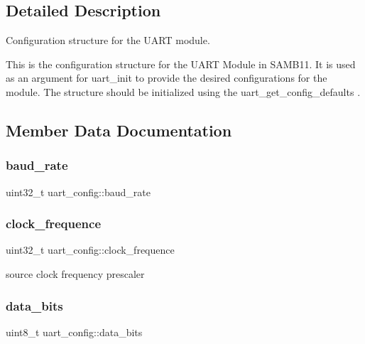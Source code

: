 \subsection{Detailed Description}
Configuration structure for the U\+A\+RT module. 

This is the configuration structure for the U\+A\+RT Module in S\+A\+M\+B11. It is used as an argument for uart\+\_\+init to provide the desired configurations for the module. The structure should be initialized using the uart\+\_\+get\+\_\+config\+\_\+defaults . 

\subsection{Member Data Documentation}
\mbox{\label{structuart__config_a3002fe5cb1c359f93dddb9198356bdcc}} 
\subsubsection{\texorpdfstring{baud\+\_\+rate}{baud\_rate}}
{\footnotesize\ttfamily uint32\+\_\+t uart\+\_\+config\+::baud\+\_\+rate}

\mbox{\label{structuart__config_a07d92658a8aea18961c39878c11fa689}} 
\subsubsection{\texorpdfstring{clock\+\_\+frequence}{clock\_frequence}}
{\footnotesize\ttfamily uint32\+\_\+t uart\+\_\+config\+::clock\+\_\+frequence}

source clock frequency prescaler \mbox{\label{structuart__config_a93ee24cf6669fb4cfece78a53d3ec6c5}} 
\subsubsection{\texorpdfstring{data\+\_\+bits}{data\_bits}}
{\footnotesize\ttfamily uint8\+\_\+t uart\+\_\+config\+::data\+\_\+bits}


